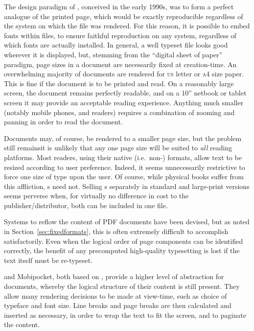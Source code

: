 The design paradigm of \pdf{}, conceived in the early 1990s,\cite{Warnock1991} was to form a perfect analogue of the printed page, which would be exactly reproducible regardless of the system on which the file was rendered. For this reason, it is possible to embed fonts within \pdf{} files, to ensure faithful reproduction on any system, regardless of which fonts are actually installed. In general, a well typeset \pdf{} file looks good wherever it is displayed, but, stemming from the ``digital sheet of paper'' paradigm, page sizes in a \pdf{} document are necessarily fixed at creation-time. An overwhelming majority of \pdf{} documents are rendered for  \textsc{us} letter or \textsc{a}4 size paper. This is fine if the document is to be printed and read. On a reasonably large screen, the document remains perfectly readable, and on a 10'' netbook or tablet screen it may provide an acceptable reading experience. Anything much smaller (notably mobile phones, and \ebook{} readers) requires a combination of zooming and panning  in order to read the document.

Documents may, of course, be rendered to a smaller page size, but the problem still remains\ed it is unlikely that any one page size will be suited to \emph{all} reading platforms. Most \ebook{} readers, using their native (i.e.\ non-\pdf{}) formats, allow text to be resized according to user preference. Indeed, it seems unnecessarily restrictive to force one size of type upon the user. Of course, while physical books suffer from this affliction, \ebook{}s need not. Selling \ebook{}s separately in standard and large-print versions seems perverse when, for virtually no difference in cost to the publisher/distributor, both can be included in one file.

Systems to reflow the content of PDF documents have been devised,\cite{Lovegrove1995,Marinai2013} but as noted in Section~\ref{sec:fixedformats}, this is often extremely difficult to accomplish satisfactorily. Even when the logical order of page components can be identified correctly, the benefit of any precomputed high-quality typesetting is lost if the text itself must be re-typeset.



\epub{} and Mobipocket, both based on \html{}, provide a higher level of abstraction for documents, whereby the logical structure of their content is still present. They allow many rendering decisions to be made at view-time, such as choice of typeface and font size. Line breaks and page breaks are then calculated and inserted as necessary, in order to wrap the text to fit the screen, and to paginate the content.

